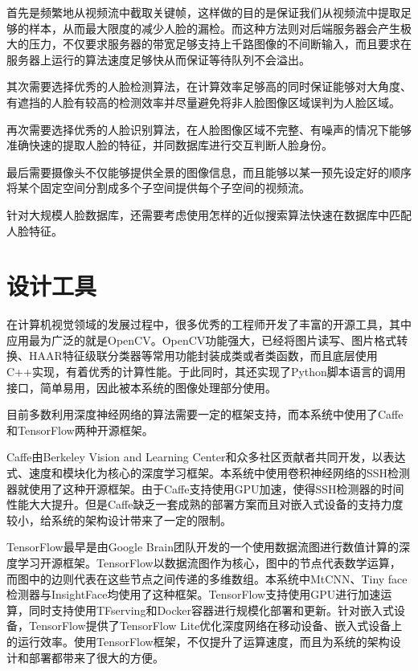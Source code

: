 首先是频繁地从视频流中截取关键帧，这样做的目的是保证我们从视频流中提取足够的样本，从而最大限度的减少人脸的漏检。而这种方法则对后端服务器会产生极大的压力，不仅要求服务器的带宽足够支持上千路图像的不间断输入，而且要求在服务器上运行的算法速度足够快从而保证等待队列不会溢出。

其次需要选择优秀的人脸检测算法，在计算效率足够高的同时保证能够对大角度、有遮挡的人脸有较高的检测效率并尽量避免将非人脸图像区域误判为人脸区域。

再次需要选择优秀的人脸识别算法，在人脸图像区域不完整、有噪声的情况下能够准确快速的提取人脸的特征，并同数据库进行交互判断人脸身份。

最后需要摄像头不仅能够提供全景的图像信息，而且能够以某一预先设定好的顺序将某个固定空间分割成多个子空间提供每个子空间的视频流。

针对大规模人脸数据库，还需要考虑使用怎样的近似搜索算法快速在数据库中匹配人脸特征。

\section{设计工具}

在计算机视觉领域的发展过程中，很多优秀的工程师开发了丰富的开源工具，其中应用最为广泛的就是OpenCV\cite{opencv_library}。OpenCV功能强大，已经将图片读写、图片格式转换、HAAR特征级联分类器等常用功能封装成类或者类函数，而且底层使用C++实现，有着优秀的计算性能。于此同时，其还实现了Python脚本语言的调用接口，简单易用，因此被本系统的图像处理部分使用。

目前多数利用深度神经网络的算法需要一定的框架支持，而本系统中使用了Caffe\cite{jia2014caffe}和TensorFlow\cite{tensorflow2015-whitepaper}两种开源框架。

Caffe由Berkeley Vision and Learning Center和众多社区贡献者共同开发，以表达式、速度和模块化为核心的深度学习框架。本系统中使用卷积神经网络的SSH检测器就使用了这种开源框架。由于Caffe支持使用GPU加速，使得SSH检测器的时间性能大大提升。但是Caffe缺乏一套成熟的部署方案而且对嵌入式设备的支持力度较小，给系统的架构设计带来了一定的限制。

TensorFlow最早是由Google Brain团队开发的一个使用数据流图进行数值计算的深度学习开源框架。TensorFlow以数据流图作为核心，图中的节点代表数学运算，而图中的边则代表在这些节点之间传递的多维数组。本系统中MtCNN\cite{zhang2016joint}、Tiny face检测器\cite{hu2017finding}与InsightFace\cite{deng2018arcface}均使用了这种框架。TensorFlow支持使用GPU进行加速运算，同时支持使用TFserving和Docker容器进行规模化部署和更新。针对嵌入式设备，TensorFlow提供了TensorFlow Lite优化深度网络在移动设备、嵌入式设备上的运行效率。使用TensorFlow框架，不仅提升了运算速度，而且为系统的架构设计和部署都带来了很大的方便。

